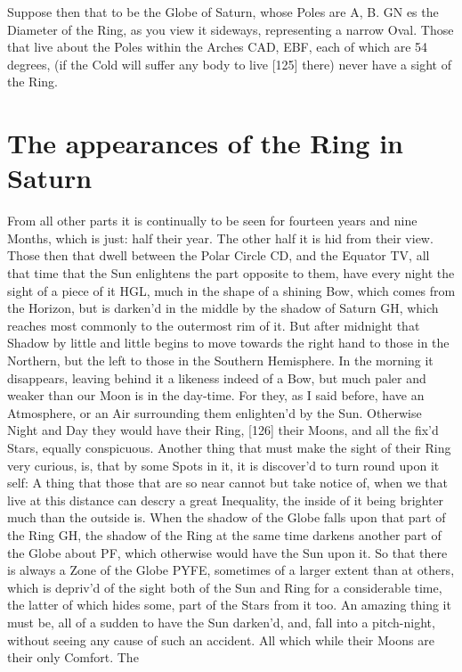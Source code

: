 \documentclass[letterpaper]{book}
\begin{document}
Suppose then that to be the Globe of Saturn, whose Poles are A, B.
GN es the Diameter of the Ring, as you view it sideways, representing a
narrow Oval. Those that live about the Poles within the Arches CAD, EBF,
each of which are 54 degrees, (if the Cold will suffer any body to live
[125] there) never have a sight of the Ring.


\section{The appearances of the Ring in Saturn}

From all other parts it is continually to be seen for fourteen years and
nine Months, which is just: half their year. The other half it is hid from
their view. Those then that dwell between the Polar Circle CD, and the
Equator TV, all that time that the Sun enlightens the part opposite to them,
have every night the sight of a piece of it HGL, much in the shape of a
shining Bow, which comes from the Horizon, but is darken'd in the middle by
the shadow of Saturn GH, which reaches most commonly to the outermost rim of
it. But after midnight that Shadow by little and little begins to move
towards the right hand to those in the Northern, but the left to those in
the Southern Hemisphere. In the morning it disappears, leaving behind it a
likeness indeed of a Bow, but much paler and weaker than our Moon is in the
day-time. For they, as I said before, have an Atmosphere, or an Air
surrounding them enlighten'd by the Sun. Otherwise Night and Day they would
have their Ring, [126] their Moons, and all the fix'd Stars, equally
conspicuous. Another thing that must make the sight of their Ring very
curious, is, that by some Spots in it, it is discover'd to turn round upon
it self: A thing that those that are so near cannot but take notice of, when
we that live at this distance can descry a great Inequality, the inside of
it being brighter much than the outside is. When the shadow of the Globe
falls upon that part of the Ring GH, the shadow of the Ring at the same time
darkens another part of the Globe about PF, which otherwise would have the
Sun upon it. So that there is always a Zone of the Globe PYFE, sometimes of a
larger extent than at others, which is depriv'd of the sight both of the Sun
and Ring for a considerable time, the latter of which hides some, part of
the Stars from it too. An amazing thing it must be, all of a sudden to have
the Sun darken'd, and, fall into a pitch-night, without seeing any cause of
such an accident. All which while their Moons are their only Comfort.  The
\end{document}
